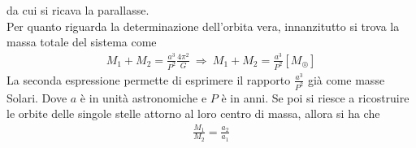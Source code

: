 \documentclass[a4paper, oneside]{book}
\begin{document}
da cui si ricava la parallasse. \\ \noindent
Per quanto riguarda la determinazione dell'orbita vera, innanzitutto si trova la massa
totale del sistema come 
\begin{align}
    M_1 + M_2 = \frac{a^{3}}{P^{2}}\frac{4\pi^{2}}{G} \ \Longrightarrow \ M_1 + M_2 = \frac{a^{3}}{P^{2}}[M_{\circledcirc}]
\end{align}
La seconda espressione permette di esprimere il rapporto $\frac{a^{3}}{P^{2}}$ già come masse Solari.
Dove $a$ è in unità astronomiche e $P$ è in anni. Se poi si riesce a ricostruire le orbite
delle singole stelle attorno al loro centro di massa, allora
si ha che
\begin{align}
    \frac{M_1}{M_2} = \frac{a_2}{a_1}
\end{align}
\end{document}

